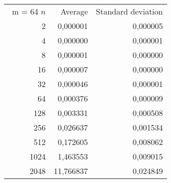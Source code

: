 \begin{tabular}{rrr}\
m = 64
 $n$ & Average & Standard deviation  \\
2 &  0,000001 &  0,000005 \\ 
4 &  0,000000 &  0,000001 \\ 
8 &  0,000001 &  0,000000 \\ 
16 &  0,000007 &  0,000000 \\ 
32 &  0,000046 &  0,000001 \\ 
64 &  0,000376 &  0,000009 \\ 
128 &  0,003331 &  0,000508 \\ 
256 &  0,026637 &  0,001534 \\ 
512 &  0,172605 &  0,008062 \\ 
1024 &  1,463553 &  0,009015 \\ 
2048 &  11,766837 &  0,024849 \\ 
\end{tabular}
